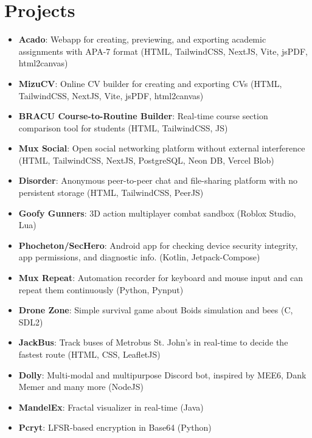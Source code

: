 \documentclass[10pt,letterpaper]{article}
\begin{document}
\section*{Projects}
\begin{itemize}
    \item \textbf{Acado}: Webapp for creating, previewing, and exporting academic assignments with APA-7 format (HTML, TailwindCSS, NextJS, Vite, jsPDF, html2canvas)
    \item \textbf{MizuCV}: Online CV builder for creating and exporting CVs (HTML, TailwindCSS, NextJS, Vite, jsPDF, html2canvas)
    \item \textbf{BRACU Course-to-Routine Builder}: Real-time course section comparison tool for students (HTML, TailwindCSS, JS)
    \item \textbf{Mux Social}: Open social networking platform without external interference (HTML, TailwindCSS, NextJS, PostgreSQL, Neon DB, Vercel Blob)
    \item \textbf{Disorder}: Anonymous peer-to-peer chat and file-sharing platform with no persistent storage (HTML, TailwindCSS, PeerJS)
    \item \textbf{Goofy Gunners}: 3D action multiplayer combat sandbox (Roblox Studio, Lua)
    \item \textbf{Phocheton/SecHero}: Android app for checking device security integrity, app permissions, and diagnostic info. (Kotlin, Jetpack-Compose)
    \item \textbf{Mux Repeat}: Automation recorder for keyboard and mouse input and can repeat them continuously (Python, Pynput)
    \item \textbf{Drone Zone}: Simple survival game about Boids simulation and bees (C, SDL2)
    \item \textbf{JackBus}: Track buses of Metrobus St. John's in real-time to decide the fastest route (HTML, CSS, LeafletJS)
    \item \textbf{Dolly}: Multi-modal and multipurpose Discord bot, inspired by MEE6, Dank Memer and many more (NodeJS)
    \item \textbf{MandelEx}: Fractal visualizer in real-time (Java)
    \item \textbf{Pcryt}: LFSR-based encryption in Base64 (Python)
\end{itemize}
\end{document}
